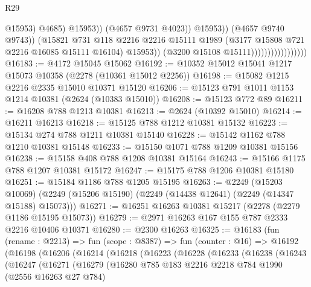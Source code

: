 \begin{lexlean}{R29}
\begin{coremodule}
                                                      @15953)
                                                    @4685)
                                                  @15953))
                                              (@4657 @9731 @4023))
                                            @15953))
                                        (@4657 @9740 @9743))
                                      (@15821
                                        @731
                                        @118
                                        @2216
                                        @2216
                                        @15111
                                        @1989
                                        (@3177 @15808 @721 @2216 @16085 @15111 @16104)
                                        @15953))
                                    (@3200 @15108 @15111)))))))))))))))))
@16183 := @4172 @15045 @15062
@16192 := @10352 @15012 @15041 @1217 @15073 @10358 (@2278 (@10361 @15012 @2256))
@16198 := @15082 @1215 @2216 @2335 @15010 @10371 @15120
@16206 := @15123 @791 @1011 @1153 @1214 @10381 (@2624 (@10383 @15010))
@16208 := @15123 @772 @89
@16211 := @16208 @788 @1213 @10381
@16213 := @2624 (@10392 @15010)
@16214 := @16211 @16213
@16218 := @15125 @788 @1212 @10381 @15132
@16223 := @15134 @274 @788 @1211 @10381 @15140
@16228 := @15142 @1162 @788 @1210 @10381 @15148
@16233 := @15150 @1071 @788 @1209 @10381 @15156
@16238 := @15158 @408 @788 @1208 @10381 @15164
@16243 := @15166 @1175 @788 @1207 @10381 @15172
@16247 := @15175 @788 @1206 @10381 @15180
@16251 := @15184 @1186 @788 @1205 @15195
@16263 := @2249
    (@15203 @10069)
    (@2249 (@15206 @15190) (@2249 (@14438 @12641) (@2249 (@14347 @15188) @15073)))
@16271 := @16251 @16263 @10381 @15217 (@2278 (@2279 @1186 @15195 @15073))
@16279 := @2971 @16263 @167 @155 @787 @2333 @2216 @10406 @10371
@16280 := @2300 @16263
@16325 := @16183
    (fun (rename : @2213) =>
    fun (scope : @8387) =>
    fun (counter : @16) =>
    @16192
      (@16198
        (@16206
          (@16214
            (@16218
              (@16223
                (@16228
                  (@16233
                    (@16238
                      (@16243
                        (@16247
                          (@16271
                            (@16279
                              (@16280
                                @785
                                @183
                                @2216
                                @2218
                                @784
                                @1990
                                (@2556 @16263 @27 @784)

\end{coremodule}
\end{lexlean}
